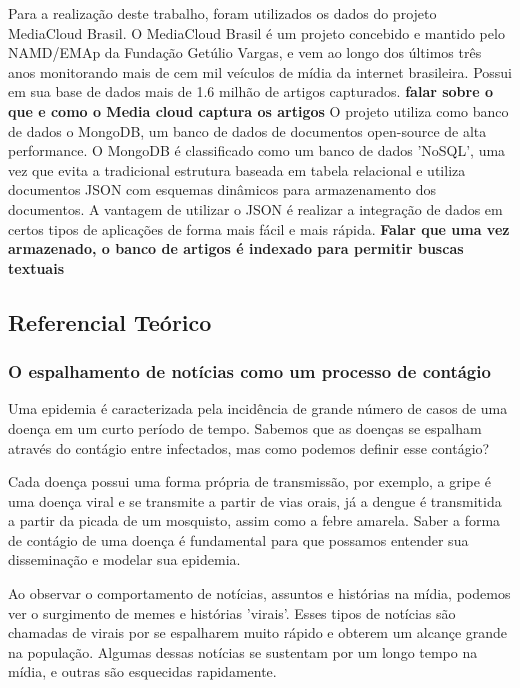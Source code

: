 \documentclass[a4paper,12pt]{article}
\begin{document}
Para a realização deste trabalho, foram utilizados os dados do projeto MediaCloud Brasil. O MediaCloud Brasil é um projeto concebido e mantido pelo
NAMD/EMAp da Fundação Getúlio Vargas, e vem ao longo dos últimos três anos monitorando mais de cem mil veículos de mídia da internet brasileira. Possui em
sua base de dados mais de 1.6 milhão de artigos capturados.
\textbf{falar sobre o que e como o Media cloud captura os artigos}
O projeto utiliza como banco de dados o MongoDB, um banco de dados de documentos open-source de alta performance. O MongoDB é classificado como um banco de 
dados 'NoSQL', uma vez que evita a tradicional estrutura  baseada em tabela relacional e utiliza documentos JSON com esquemas dinâmicos para armazenamento 
dos documentos. A vantagem de utilizar o JSON é realizar a integração de dados em certos tipos de aplicações de forma mais fácil e mais rápida.
\textbf{Falar que uma vez armazenado, o banco de artigos é indexado para permitir buscas textuais}

\subsection{Referencial Teórico}


\subsubsection{O espalhamento de notícias como um processo de contágio}

Uma epidemia é caracterizada pela incidência de grande número de casos de uma doença em um curto período de tempo. Sabemos que as doenças
se espalham através do contágio entre infectados, mas como podemos definir esse contágio? 

Cada doença possui uma forma própria de transmissão, por exemplo, a gripe é uma doença viral e se transmite a partir de vias orais, já a dengue
é transmitida a partir da picada de um mosquisto, assim como a febre amarela. Saber a forma de contágio de uma doença é fundamental para que
possamos entender sua disseminação e modelar sua epidemia.

Ao observar o comportamento de notícias, assuntos e histórias na mídia, podemos ver o surgimento de memes e histórias 'virais'. Esses 
tipos de notícias são chamadas de virais por se espalharem muito rápido e obterem um alcançe grande na população. Algumas dessas notícias
se sustentam por um longo tempo na mídia, e outras são esquecidas rapidamente. 
\end{document}
